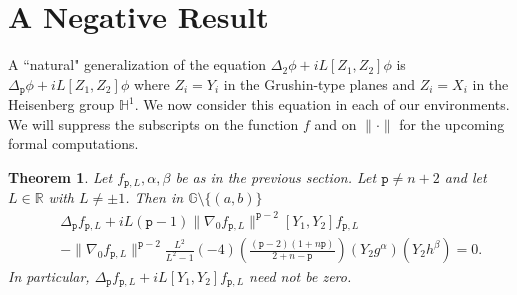\documentclass[12pt]{amsart}
\theoremstyle{plain}
\newtheorem{theorem}{Theorem}[section]
\theoremstyle{definition}
\numberwithin{equation}{section}
\begin{document}
\section{A Negative Result}
A ``natural" generalization of the equation $\Delta_2\phi+iL[Z_1,Z_2]\phi$ is $\Delta_{\texttt{p}}\phi+iL[Z_1,Z_2]\phi$ where $Z_i=Y_i$ in the Grushin-type planes and $Z_i=X_i$ in the Heisenberg group $\mathbb{H}^1$.  We now consider this equation in each of our environments. 
We will suppress the subscripts on the function $f$ and on $\|\cdot\|$ for the upcoming formal computations.
\begin{theorem} \label{negg}
Let $f_{{\texttt{p}},L}, \alpha,\beta$ be as in the previous section.  Let ${\texttt{p}} \neq n+2$ and let $L \in \mathbb{R}$ with $L \neq \pm 1$.  Then in $\mathbb{G} \setminus \{(a,b)\}$
\begin{eqnarray*}
& & \Delta_{\texttt{p}} f_{{\texttt{p}},L}+iL({\texttt{p}}-1) \|\nabla_0 f_{{\texttt{p}},L} \|^{{\texttt{p}}-2}[Y_1,Y_2]f_{{\texttt{p}},L}  \\
& &\mbox{} -\|\nabla_0 f_{{\texttt{p}},L} \|^{{\texttt{p}}-2} \frac{L^2}{L^2-1}(-4)\left(\frac{({\texttt{p}}-2)(1+n{\texttt{p}})}{2+n-{\texttt{p}}}\right)(Y_2g^{\alpha})(Y_2h^{\beta})=0.
\end{eqnarray*} 
In particular, $\Delta_{\texttt{p}} f_{{\texttt{p}},L} +i L [Y_1,Y_2]f_{{\texttt{p}},L}$ need not be zero. 
\end{theorem}
\end{document}
